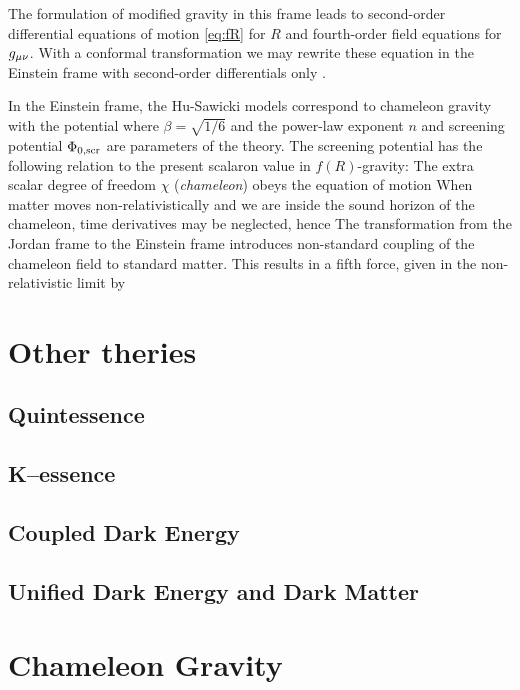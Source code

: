 The formulation of modified gravity in this frame leads to second-order differential equations of motion \eqref{eq:fR} for $R$ and fourth-order field equations for $g_{\mu\nu}$. With a conformal transformation we may rewrite these equation in the Einstein frame with second-order differentials only \parencite[see, e.g.,][]{CHIBA20031}.

In the Einstein frame, the Hu-Sawicki models correspond to chameleon gravity with the potential
where $\beta=\sqrt{1/6}$ and the power-law exponent $n$ and screening potential $\Phi_{0,\text{\scriptsize scr}}$ are parameters of the theory. The screening potential has the following relation to the present scalaron value in $f(R)$-gravity:
The extra scalar degree of freedom $\chi$ (\textit{chameleon}) obeys the equation of motion
When matter moves non-relativistically and we are inside the sound horizon of the chameleon, time derivatives may be neglected, hence
The transformation from the Jordan frame to the Einstein frame introduces non-standard coupling of the chameleon field to standard matter. This results in a fifth force, given in the non-relativistic limit by

\section{Other theries}
\subsection{Quintessence}
\subsection{K--essence}
\subsection{Coupled Dark Energy}
\subsection{Unified Dark Energy and Dark Matter}
\section{Chameleon Gravity}